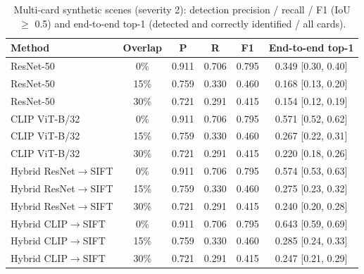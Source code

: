 \begin{table}[htbp]\centering\small
\caption[Multi-card scenes]{Multi-card synthetic scenes (severity 2): detection precision / recall / F1 (IoU $\geq$ 0.5) and end-to-end top-1 (detected and correctly identified / all cards).}\label{tab:scenes}
\begin{tabular}{@{}lccccc@{}}
\toprule
Method & Overlap & P & R & F1 & End-to-end top-1\\
\midrule
ResNet-50 & 0\% & 0.911 & 0.706 & 0.795 & 0.349 {\scriptsize[0.30, 0.40]}\\
ResNet-50 & 15\% & 0.759 & 0.330 & 0.460 & 0.168 {\scriptsize[0.13, 0.20]}\\
ResNet-50 & 30\% & 0.721 & 0.291 & 0.415 & 0.154 {\scriptsize[0.12, 0.19]}\\
CLIP ViT-B/32 & 0\% & 0.911 & 0.706 & 0.795 & 0.571 {\scriptsize[0.52, 0.62]}\\
CLIP ViT-B/32 & 15\% & 0.759 & 0.330 & 0.460 & 0.267 {\scriptsize[0.22, 0.31]}\\
CLIP ViT-B/32 & 30\% & 0.721 & 0.291 & 0.415 & 0.220 {\scriptsize[0.18, 0.26]}\\
Hybrid ResNet$\to$SIFT & 0\% & 0.911 & 0.706 & 0.795 & 0.574 {\scriptsize[0.53, 0.63]}\\
Hybrid ResNet$\to$SIFT & 15\% & 0.759 & 0.330 & 0.460 & 0.275 {\scriptsize[0.23, 0.32]}\\
Hybrid ResNet$\to$SIFT & 30\% & 0.721 & 0.291 & 0.415 & 0.240 {\scriptsize[0.20, 0.28]}\\
Hybrid CLIP$\to$SIFT & 0\% & 0.911 & 0.706 & 0.795 & 0.643 {\scriptsize[0.59, 0.69]}\\
Hybrid CLIP$\to$SIFT & 15\% & 0.759 & 0.330 & 0.460 & 0.285 {\scriptsize[0.24, 0.33]}\\
Hybrid CLIP$\to$SIFT & 30\% & 0.721 & 0.291 & 0.415 & 0.247 {\scriptsize[0.21, 0.29]}\\
\bottomrule
\end{tabular}
\end{table}
